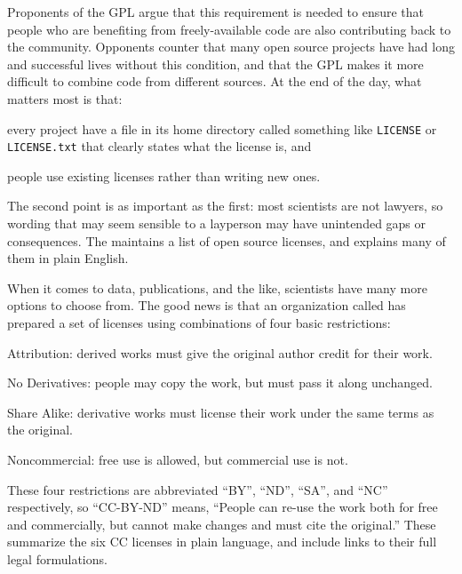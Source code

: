 Proponents of the GPL argue that this requirement is needed to ensure
that people who are benefiting from freely-available code are also
contributing back to the community. Opponents counter that many open
source projects have had long and successful lives without this
condition, and that the GPL makes it more difficult to combine code from
different sources. At the end of the day, what matters most is that:

\begin{swcenumerate}
\item
  every project have a file in its home directory called something like
  \texttt{LICENSE} or \texttt{LICENSE.txt} that clearly states what the
  license is, and
\item
  people use existing licenses rather than writing new ones.
\end{swcenumerate}

The second point is as important as the first: most scientists are not
lawyers, so wording that may seem sensible to a layperson may have
unintended gaps or consequences. The  maintains a list of open source licenses, and
 explains many of them in
plain English.

When it comes to data, publications, and the like, scientists have many
more options to choose from. The good news is that an organization
called  has prepared
a set of licenses using combinations of four basic restrictions:

\begin{swcitemize}
\item
  Attribution: derived works must give the original author credit for
  their work.
\item
  No Derivatives: people may copy the work, but must pass it along
  unchanged.
\item
  Share Alike: derivative works must license their work under the same
  terms as the original.
\item
  Noncommercial: free use is allowed, but commercial use is not.
\end{swcitemize}

These four restrictions are abbreviated ``BY'', ``ND'', ``SA'', and
``NC'' respectively, so ``CC-BY-ND'' means, ``People can re-use the work
both for free and commercially, but cannot make changes and must cite
the original.'' These  summarize the six CC licenses in plain language, and
include links to their full legal formulations.

